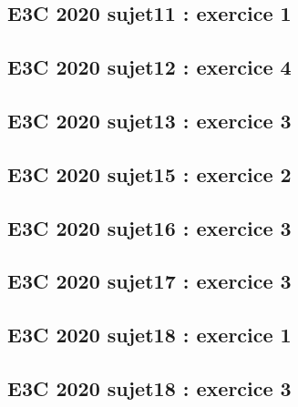 \documentclass[lang=fr,edition=teacher,layout=sheet]{mxbook}
\begin{document}
\subsection*{E3C 2020 sujet11 : exercice 1}
\begingroup\endgroup
\par\bigskip
{}\subsection*{E3C 2020 sujet12 : exercice 4}
\begingroup\endgroup
\par\bigskip
{}\subsection*{E3C 2020 sujet13 : exercice 3}
\begingroup\endgroup
\par\bigskip
{}\subsection*{E3C 2020 sujet15 : exercice 2}
\begingroup\endgroup
\par\bigskip
{}\subsection*{E3C 2020 sujet16 : exercice 3}
\begingroup\endgroup
\par\bigskip
{}\subsection*{E3C 2020 sujet17 : exercice 3}
\begingroup\endgroup
\par\bigskip
{}\subsection*{E3C 2020 sujet18 : exercice 1}
\begingroup\endgroup
\par\bigskip
{}\subsection*{E3C 2020 sujet18 : exercice 3}
\end{document}
